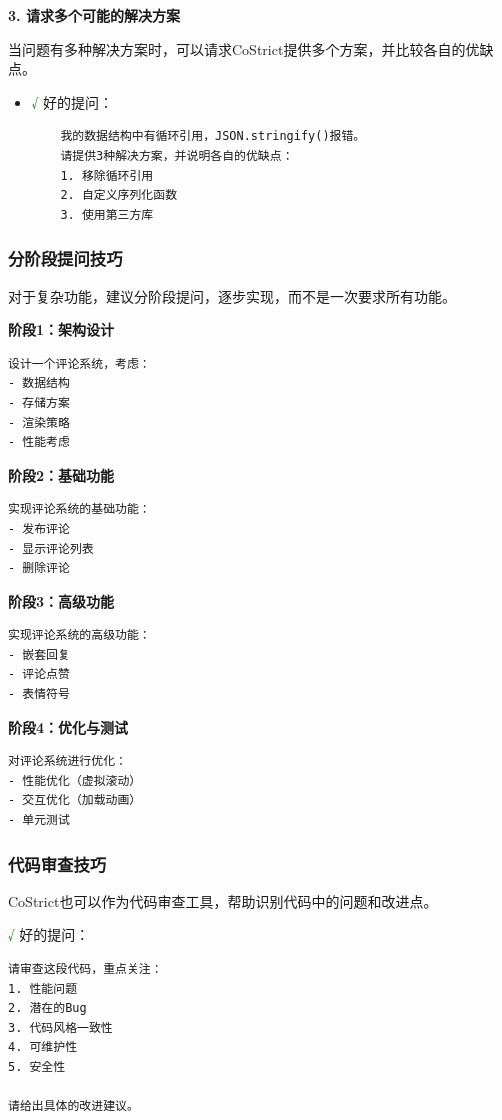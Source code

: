 ﻿\documentclass[12pt,a4paper]{article}
\begin{document}
\textbf{3. 请求多个可能的解决方案}

当问题有多种解决方案时，可以请求CoStrict提供多个方案，并比较各自的优缺点。

\begin{itemize}
    \item \textcolor{green}{√} 好的提问：
    \begin{verbatim}
    我的数据结构中有循环引用，JSON.stringify()报错。
    请提供3种解决方案，并说明各自的优缺点：
    1. 移除循环引用
    2. 自定义序列化函数
    3. 使用第三方库
    \end{verbatim}
\end{itemize}

\subsubsection{分阶段提问技巧}

对于复杂功能，建议分阶段提问，逐步实现，而不是一次要求所有功能。

\textbf{阶段1：架构设计}
\begin{verbatim}
设计一个评论系统，考虑：
- 数据结构
- 存储方案
- 渲染策略
- 性能考虑
\end{verbatim}

\textbf{阶段2：基础功能}
\begin{verbatim}
实现评论系统的基础功能：
- 发布评论
- 显示评论列表
- 删除评论
\end{verbatim}

\textbf{阶段3：高级功能}
\begin{verbatim}
实现评论系统的高级功能：
- 嵌套回复
- 评论点赞
- 表情符号
\end{verbatim}

\textbf{阶段4：优化与测试}
\begin{verbatim}
对评论系统进行优化：
- 性能优化（虚拟滚动）
- 交互优化（加载动画）
- 单元测试
\end{verbatim}

\subsubsection{代码审查技巧}

CoStrict也可以作为代码审查工具，帮助识别代码中的问题和改进点。

\textcolor{green}{√} 好的提问：
\begin{verbatim}
请审查这段代码，重点关注：
1. 性能问题
2. 潜在的Bug
3. 代码风格一致性
4. 可维护性
5. 安全性

请给出具体的改进建议。
\end{verbatim}
\end{document}
